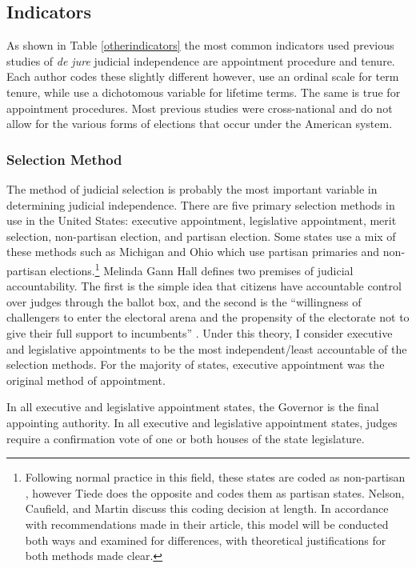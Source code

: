 \documentclass[12pt]{article}
\begin{document}
\subsection*{Indicators}
As shown in Table \ref{otherindicators} the most common indicators used previous studies of \textit{de jure} judicial independence are appointment procedure and tenure.  Each author codes these slightly different however, \citet{Feld2003} use an ordinal scale for term tenure, while \citet{Melton2014} use a dichotomous variable for lifetime terms.  The same is true for appointment procedures.  Most previous studies were cross-national and do not allow for the various forms of elections that occur under the American system.     
\subsubsection*{Selection Method}
The method of judicial selection is probably the most important variable in determining judicial independence. There are five primary selection methods in use in the United States: executive appointment, legislative appointment, merit selection, non-partisan election, and partisan election. Some states use a mix of these methods such as Michigan and Ohio which use partisan primaries and non-partisan elections.\footnote{Following normal practice in this field, these states are coded as non-partisan \citep{Canes-Wrone2012, Caldarone2009}, however Tiede \citeyearpar{Tiede2006} does the opposite and codes them as partisan states. Nelson, Caufield, and Martin \citeyearpar{Nelson2013} discuss this coding decision at length.  In accordance with recommendations made in their article, this model will be conducted both ways and examined for differences, with theoretical justifications for both methods made clear.  }  Melinda Gann Hall \citeyearpar{Hall2007} defines two premises of judicial accountability. The first is the simple idea that citizens have accountable control over judges through the ballot box, and the second is the ``willingness of challengers to enter the electoral arena and the propensity of the electorate not to give their full support to incumbents'' \citep{Hall2007}.  Under this theory, I consider executive and legislative appointments to be the most independent/least accountable of the selection methods.  For the majority of states, executive appointment was the original method of appointment.  

In all executive and legislative appointment states, the Governor is the final appointing authority.  In all executive and legislative appointment states, judges require a confirmation vote of one or both houses of the state legislature. 
\end{document}
